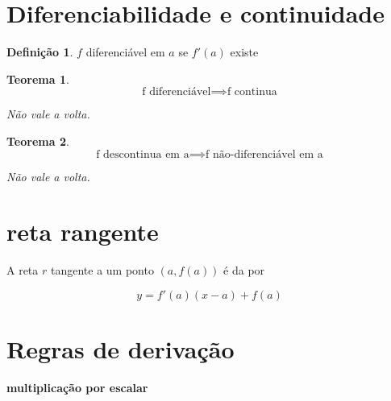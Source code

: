 \documentclass[14pt]{extreport}
\newtheorem{theorem}{Teorema}
\theoremstyle{definition}
\newtheorem{definition}{Definição}
\begin{document}
\section{Diferenciabilidade e continuidade}

\begin{definition}
    \(f\) diferenciável em \(a\) se \(f'(a)\) existe    
\end{definition}

\begin{theorem}
    \begin{equation}
        \text{f diferenciável} \implies \text{f continua}
    \end{equation}
    
    Não vale a volta.
\end{theorem}

\begin{theorem}
    \begin{equation}
        \text{f descontinua em a} \implies \text{f não-diferenciável em a}  
    \end{equation}
    
    Não vale a volta.
\end{theorem}

\section{reta rangente}

A reta \(r\) tangente a um ponto \((a, f(a))\)
é da por

\begin{equation}
y = f'(a)(x - a) + f(a)    
\end{equation}


\section{Regras de derivação}

\textbf{multiplicação por escalar}
\end{document}
